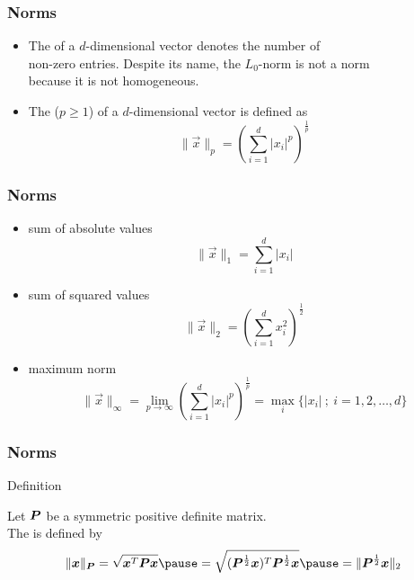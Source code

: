 \begin{frame}
  \frametitle{Norms \cont}
    \begin{itemize}
      \item The  of a $d$-dimensional vector denotes the number of \\
        non-zero entries. Despite its name, the $L_0$-norm is not a norm \\
        because it is not homogeneous. \pause
      \item The  ($p \geq 1$) of a $d$-dimensional vector is defined as 
        \begin{displaymath}
          \| \vec x\|_p = \left( \sum_{i=1}^d  |x_i|^p \right)^{\frac{1}{p}}
        \end{displaymath}
    \end{itemize}
\end{frame}
 
 
\begin{frame}
  \frametitle{Norms \cont}

  \begin{itemize}
    \item {} sum of absolute values
      \begin{displaymath}
        \| \vec x\|_1 = \sum_{i=1}^d |x_i|
      \end{displaymath}
      \pause
    \item {} sum of squared values
      \begin{displaymath}
        \| \vec x\|_2 = \left(\sum_{i=1}^d x_i^2\right)^{\frac{1}{2}}
      \end{displaymath}
      \pause
    \item {} maximum norm
      \begin{displaymath}
        \| \vec x\|_\infty = 
        \lim_{p\rightarrow \infty} \left( \sum_{i=1}^d  |x_i|^p \right)^{\frac{1}{p}} =
        \max_i \{ |x_i| \ ; \ i=1,2, \dots, d \}
      \end{displaymath}
  \end{itemize}
\end{frame}
 
 
\begin{frame}
  \frametitle{Norms \cont}

  \begin{citeblock}{Definition}

    Let ${\bm P}$ be a symmetric positive definite matrix. \\
    The  is defined by 
    \begin{displaymath}
      \| \vec x\|_{\mat P} = 
      \sqrt{ \vec x^T \mat P \vec x} \pause = 
      \sqrt{ (\mat P^\frac{1}{2} \vec x)^T \mat P^\frac{1}{2} \vec x} \pause =
      \| \mat P^\frac{1}{2} \vec x\|_2
    \end{displaymath}
  \end{citeblock}
\end{frame}


